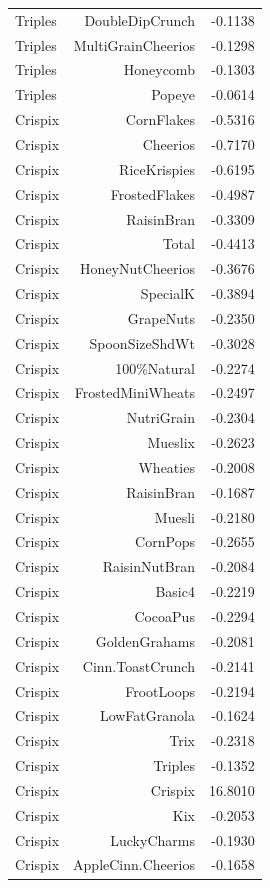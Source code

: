 \begin{longtable}{@{}lrr@{}}
Triples & DoubleDipCrunch & -0.1138 \\
Triples & MultiGrainCheerios & -0.1298 \\
Triples & Honeycomb & -0.1303 \\
Triples & Popeye & -0.0614 \\
Crispix & CornFlakes & -0.5316 \\
Crispix & Cheerios & -0.7170 \\
Crispix & RiceKrispies & -0.6195 \\
Crispix & FrostedFlakes & -0.4987 \\
Crispix & RaisinBran & -0.3309 \\
Crispix & Total & -0.4413 \\
Crispix & HoneyNutCheerios & -0.3676 \\
Crispix & SpecialK & -0.3894 \\
Crispix & GrapeNuts & -0.2350 \\
Crispix & SpoonSizeShdWt & -0.3028 \\
Crispix & 100\%Natural & -0.2274 \\
Crispix & FrostedMiniWheats & -0.2497 \\
Crispix & NutriGrain & -0.2304 \\
Crispix & Mueslix & -0.2623 \\
Crispix & Wheaties & -0.2008 \\
Crispix & RaisinBran & -0.1687 \\
Crispix & Muesli & -0.2180 \\
Crispix & CornPops & -0.2655 \\
Crispix & RaisinNutBran & -0.2084 \\
Crispix & Basic4 & -0.2219 \\
Crispix & CocoaPus & -0.2294 \\
Crispix & GoldenGrahams & -0.2081 \\
Crispix & Cinn.ToastCrunch & -0.2141 \\
Crispix & FrootLoops & -0.2194 \\
Crispix & LowFatGranola & -0.1624 \\
Crispix & Trix & -0.2318 \\
Crispix & Triples & -0.1352 \\
Crispix & Crispix & 16.8010 \\
Crispix & Kix & -0.2053 \\
Crispix & LuckyCharms & -0.1930 \\
Crispix & AppleCinn.Cheerios & -0.1658 \\

\end{longtable}
